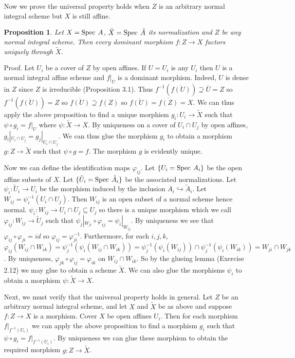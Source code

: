 \documentclass[12pt]{article}
\newtheorem{prop}{Proposition}
\newcommand{\ol}{\overline}
\renewcommand{\phi}{\varphi}
\newcommand{\spec}{\mbox{\rm Spec \hspace{.01in}}}
\newcommand{\proof}{\mbox{\sc Proof.\hspace{.1in}}}
\begin{document}
Now we prove the universal property holds when $Z$ is an arbitrary
normal integral scheme but $X$ is still affine.  
\begin{prop} Let $X=\spec A$, $\tilde X=\spec \tilde A$ its 
normalization and $Z$ be any normal integral scheme. Then
every dominant morphism $f:Z\rightarrow X$ factors uniquely 
through $\tilde X$. 
\end{prop}
\proof
Let $U_i$ be a cover of $Z$ by open affines. If $U=U_i$ is any
$U_i$ then $U$ is a normal
integral affine scheme and $f|_U$ is a dominant morphism. Indeed,
$U$ is dense in $Z$ since $Z$ is irreducible (Proposition 3.1). 
Thus $f^{-1}(\ol{f(U)})\supseteq \ol{U}=Z$ so 
$f^{-1}(\ol{f(U)})=Z$ so $\ol{f(U)}\supseteq f(Z)$ so
$\ol{f(U)}=\ol{f(Z)}=X$.
We can thus apply the above proposition to find a unique morphism
$g_i:U_i\rightarrow \tilde{X}$ such that $\psi\circ g_i=f|_U$ where
$\psi:\tilde{X}\rightarrow X$. By uniqueness on a cover of $U_i\cap U_j$
by open affines, $g_i|_{U_i\cap U_j}=g_j|_{U_i\cap U_j}$. We
can thus glue the morphism $g_i$ to obtain a morphism 
$g:Z\rightarrow \tilde{X}$ such that $\psi\circ g=f$. The  
morphism $g$ is evidently unique.  

Now we can define the identification maps $\phi_{ij}$. Let
$\{U_i=\spec A_i\}$ be the open affine subsets of $X$. Let
$\{\tilde U_i=\spec \tilde A_i\}$ be the associated normalizations.
Let $\psi_i:\tilde U_i \rightarrow U_i$ be the morphism induced
by the inclusion $A_i \hookrightarrow \tilde A_i$. Let
$W_{ij}=\psi_i^{-1}(U_i\cap U_j)$. Then $W_{ij}$ is an open
subset of a normal scheme hence normal. $\psi_i:W_{ij}\rightarrow
U_i\cap U_j \subseteq U_j$ so there is a unique morphism
which we call $\phi_{ij}:W_{ij}\rightarrow \tilde U_j$ such
that $\psi_j|_{W_{ji}} \circ \phi_{ij} = \psi_i|_{W_{ij}}$.
By uniqueness we see that $\phi_{ij}\circ\phi_{ji}=id$ so
$\phi_{ij}=\phi_{ji}^{-1}$.  Furthermore, for each $i,j,k$, 
$\phi_{ij}(W_{ij}\cap W_{ik})
=\psi_j^{-1}(\psi_i(W_{ij}\cap W_{ik}))
=\psi_j^{-1}(\psi_i(W_{ij}))\cap \psi_j^{-1}(\psi_i(W_{ik}))
=W_{ji}\cap W_{jk}$. By uniqueness, 
$\phi_{jk}\circ\phi_{ij}=\phi_{ik}$ on $W_{ij}\cap W_{ik}$. 
So by the glueing lemma (Exercise 2.12) we may glue to obtain
a scheme $\tilde X$. We can also glue the morphisms $\psi_i$ 
to obtain a morphism $\psi:\tilde X\rightarrow X$. 

Next, we must verify that the universal property holds in general.
Let $Z$ be an arbitrary normal integral scheme, and let $X$
and $\tilde{X}$ be as above and suppose $f:Z\rightarrow X$ is a morphism. 
Cover $X$ be open affines $U_i$. Then for each morphism $f|_{f^{-1}(U_i)}$
we can apply the above proposition to find a morphism $g_i$ such
that $\psi\circ g_i=f|_{f^{-1}(U_i)}$. By uniqueness we can
glue these morphism to obtain the required morphism 
$g:Z\rightarrow \tilde{X}$. 
\end{document}
